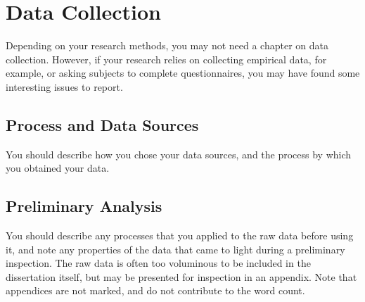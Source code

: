 \chapter{Data Collection}
Depending on your research methods, you may not need a chapter on data collection. However, if your research relies on collecting empirical data, for example, or asking subjects to complete questionnaires, you may have found some interesting issues to report.

\section{Process and Data Sources}
You should describe how you chose your data sources, and the process by which you obtained your data.

\section{Preliminary Analysis}
You should describe any processes that you applied to the raw data before using it, and note any properties of the data that came to light during a preliminary inspection.
The raw data is often too voluminous to be included in the dissertation itself, but may be presented for inspection in an appendix. Note that appendices are not marked, and do not contribute to the word count.
